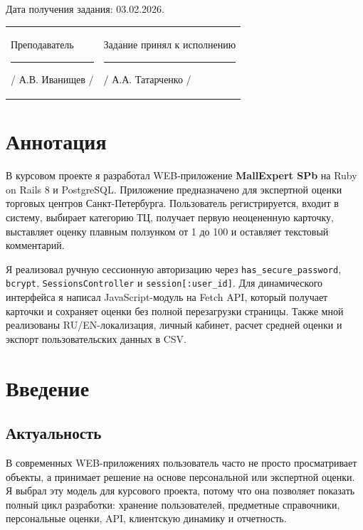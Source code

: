 \documentclass[14pt,a4paper]{extarticle}
\begin{document}
Дата получения задания: 03.02.2026.

\vspace{1cm}
\begin{tabularx}{\textwidth}{X X}
Преподаватель \newline \newline \rule{55mm}{0.4pt} / А.В. Иванищев / &
Задание принял к исполнению \newline \newline \rule{55mm}{0.4pt} / А.А. Татарченко /
\end{tabularx}

\newpage
\section*{Аннотация}

В курсовом проекте я разработал WEB-приложение \textbf{MallExpert SPb} на Ruby on Rails 8 и PostgreSQL. Приложение предназначено для экспертной оценки торговых центров Санкт-Петербурга. Пользователь регистрируется, входит в систему, выбирает категорию ТЦ, получает первую неоцененную карточку, выставляет оценку плавным ползунком от 1 до 100 и оставляет текстовый комментарий.

Я реализовал ручную сессионную авторизацию через \texttt{has\_secure\_password}, \texttt{bcrypt}, \texttt{SessionsController} и \texttt{session[:user\_id]}. Для динамического интерфейса я написал JavaScript-модуль на Fetch API, который получает карточки и сохраняет оценки без полной перезагрузки страницы. Также мной реализованы RU/EN-локализация, личный кабинет, расчет средней оценки и экспорт пользовательских данных в CSV.

\tableofcontents
\newpage

\section{Введение}
\subsection{Актуальность}

В современных WEB-приложениях пользователь часто не просто просматривает объекты, а принимает решение на основе персональной или экспертной оценки. Я выбрал эту модель для курсового проекта, потому что она позволяет показать полный цикл разработки: хранение пользователей, предметные справочники, персональные оценки, API, клиентскую динамику и отчетность.
\end{document}
